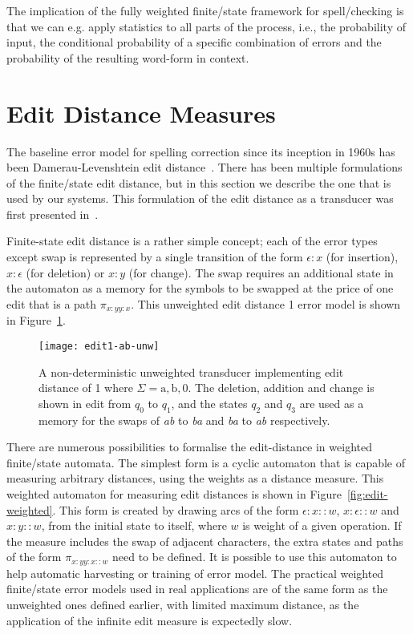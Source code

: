 \documentclass[officiallayout]{unihelcompling}
\begin{document}
The implication of the fully weighted finite\-/state framework for
spell\-/checking is that we can e.g. apply statistics to all parts of the
process, i.e., the probability of input, the conditional probability of a
specific combination of errors and the probability of the resulting word-form
in context. 

\section{Edit Distance Measures}
\label{sec:edit-distance}

The baseline error model for spelling correction since its inception in 1960s
has been Damerau-Levenshtein edit
distance~\citep{damerau1964technique,levenshtein1966binary}. There has been
multiple formulations of the finite\-/state edit distance, but in this section
we describe the one that is used by our systems. This formulation of the edit
distance as a transducer was first presented
in~\citet{schulz2002fast}.

Finite-state edit distance is a rather simple concept; each of the error types
except swap is represented by a single transition of the form $\epsilon:x$ (for
insertion), $x:\epsilon$ (for deletion) or $x:y$ (for change). The swap
requires an additional state in the automaton as a memory for the symbols to be
swapped at the price of one edit that is a path $\pi_{x:y y:x}$. This
unweighted edit distance 1 error model is shown in Figure~\ref{fig:edit1-ab}.

\begin{figure}
    \texttt{[image: edit1-ab-unw]}
    \caption{A non-deterministic unweighted transducer implementing
        edit distance of 1 where $\Sigma = {\mathrm{a}, \mathrm{b}, 0}$.
        The deletion, addition and change is shown in
        edit from $q_0$ to $q_1$, and the states $q_2$ and $q_3$ are used as a
        memory for the swaps of \emph{ab} to \emph{ba} and \emph{ba} to
        \emph{ab} respectively.  \label{fig:edit1-ab}}
\end{figure}

There are numerous possibilities to formalise the edit-distance in weighted
finite\-/state automata. The simplest form is a cyclic automaton that is
capable of measuring arbitrary distances, using the weights as a distance
measure. This weighted automaton for measuring edit distances is shown in
Figure~\ref{fig:edit-weighted}. This form is created by drawing arcs of the
form $\epsilon:x::w$, $x:\epsilon::w$ and $x:y::w$, from the initial state to
itself, where $w$ is weight of a given operation. If the measure includes the
swap of adjacent characters, the extra states and paths of the form $\pi_{x:y
y:x::w}$ need to be defined. It is possible to use this automaton to help
automatic harvesting or training of error model. The practical weighted
finite\-/state error models used in real applications are of the same form as
the unweighted ones defined earlier, with limited maximum distance, as the
application of the infinite edit measure is expectedly slow.
\end{document}
